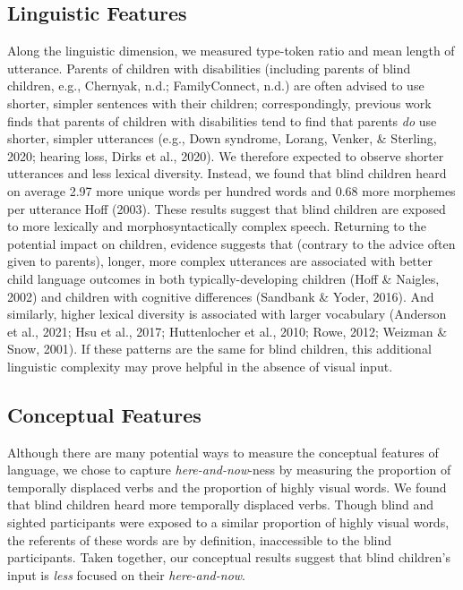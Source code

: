 \documentclass[
  man]{apa6}
\begin{document}
\hypertarget{linguistic-features-2}{%
\subsection{Linguistic Features}\label{linguistic-features-2}}

Along the linguistic dimension, we measured type-token ratio and mean length of utterance. Parents of children with disabilities (including parents of blind children, e.g., Chernyak, n.d.; FamilyConnect, n.d.) are often advised to use shorter, simpler sentences with their children; correspondingly, previous work finds that parents of children with disabilities tend to find that parents \emph{do} use shorter, simpler utterances (e.g., Down syndrome, Lorang, Venker, \& Sterling, 2020; hearing loss, Dirks et al., 2020). We therefore expected to observe shorter utterances and less lexical diversity. Instead, we found that blind children heard on average 2.97 more unique words per hundred words and 0.68 more morphemes per utterance Hoff (2003). These results suggest that blind children are exposed to more lexically and morphosyntactically complex speech. Returning to the potential impact on children, evidence suggests that (contrary to the advice often given to parents), longer, more complex utterances are associated with better child language outcomes in both typically-developing children (Hoff \& Naigles, 2002) and children with cognitive differences (Sandbank \& Yoder, 2016). And similarly, higher lexical diversity is associated with larger vocabulary (Anderson et al., 2021; Hsu et al., 2017; Huttenlocher et al., 2010; Rowe, 2012; Weizman \& Snow, 2001). If these patterns are the same for blind children, this additional linguistic complexity may prove helpful in the absence of visual input.

\hypertarget{conceptual-features-2}{%
\subsection{Conceptual Features}\label{conceptual-features-2}}

Although there are many potential ways to measure the conceptual features of language, we chose to capture \emph{here-and-now}-ness by measuring the proportion of temporally displaced verbs and the proportion of highly visual words. We found that blind children heard more temporally displaced verbs. Though blind and sighted participants were exposed to a similar proportion of highly visual words, the referents of these words are by definition, inaccessible to the blind participants. Taken together, our conceptual results suggest that blind children's input is \emph{less} focused on their \emph{here-and-now}.
\end{document}
